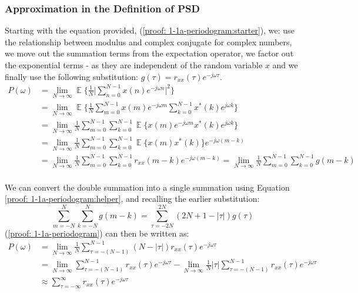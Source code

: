 \documentclass[12pt]{article}
\numberwithin{equation}{section}
\DeclareMathOperator*{\E}{\mathbb{E}}
\begin{document}
	\subsubsection{Approximation in the Definition of PSD} \label{sec: 1-1a-prop-PSD}
	Starting with the equation provided, (\ref{proof: 1-1a-periodogram:starter}), we: use the relationship between modulus and complex conjugate for complex numbers, we move out the summation terms from the expectation operator, we factor out the exponential terms - as they are independent of the random variable $x$ and we finally use the following substitution:  $g(\tau) = r_{xx}(\tau) e^{-j\omega\tau}$.
	\begin{align}
		P(\omega)   & =\lim_{N\to\infty} \E \bigg\{ \frac{1}{N} \bigg| \sum_{n=0}^{N-1} x(n) e^{-j\omega n} \bigg|^{2} \bigg\}
		\label{proof: 1-1a-periodogram:starter}\\
		& = \lim_{N\to\infty} \E \bigg\{\frac{1}{N}
		\sum_{m=0}^{N-1} x(m) e^{-j\omega m} \sum_{k=0}^{N-1} x^{*}(k) e^{j\omega k} \bigg\}\nonumber\\
		& = \lim_{N\to\infty} \frac{1}{N}
		\sum_{m=0}^{N-1} \sum_{k=0}^{N-1} \E \bigg\{ x(m) e^{-j\omega m} x^{*}(k) e^{j\omega k} \bigg\}\nonumber\\
		& = \lim_{N\to\infty} \frac{1}{N}
		\sum_{m=0}^{N-1} \sum_{k=0}^{N-1} \E \bigg\{ x(m) x^{*}(k) \bigg\} e^{-j\omega(m-k)} \nonumber\\
		& = \lim_{N\to\infty} \frac{1}{N}
		\sum_{m=0}^{N-1} \sum_{k=0}^{N-1} r_{xx}(m-k) e^{-j\omega(m-k)}
		= \lim_{N\to\infty} \frac{1}{N}
		\sum_{m=0}^{N-1} \sum_{k=0}^{N-1} g(m-k)
		\label{proof: 1-1a-periodogram}
	\end{align}
	\\
	We can convert the double summation into a single summation using Equation \ref{proof: 1-1a-periodogram:helper}, and recalling the earlier substitution:
	\begin{equation}
		\sum_{m=-N}^{N} \sum_{k=-N}^{N} g(m-k) = \sum_{\tau=-2N}^{2N}(2N + 1 - |\tau|)g(\tau)
		\label{proof: 1-1a-periodogram:helper}
	\end{equation}
	(\ref{proof: 1-1a-periodogram}) can then be written as:
	\vspace*{-0.8\baselineskip}
	\begin{align}
		P(\omega)    & =         \lim_{N\to\infty} \frac{1}{N} \sum_{\tau=-(N-1)}^{N-1}(N - |\tau|)r_{xx}(\tau) e^{-j\omega\tau}\nonumber\\
		& =         \lim_{N\to\infty} \sum_{\tau=-(N-1)}^{N-1} r_{xx}(\tau) e^{-j\omega\tau} -
		\lim_{N\to\infty} \frac{1}{N} |\tau| \sum_{\tau=-(N-1)}^{N-1} r_{xx}(\tau) e^{-j\omega\tau}\nonumber\\
		& \approx   \sum_{\tau=-\infty}^{\infty} r_{xx}(\tau) e^{-j\omega\tau}
		\label{proof: 1-1a-periodogram:shown}
	\end{align}
	
\end{document}
